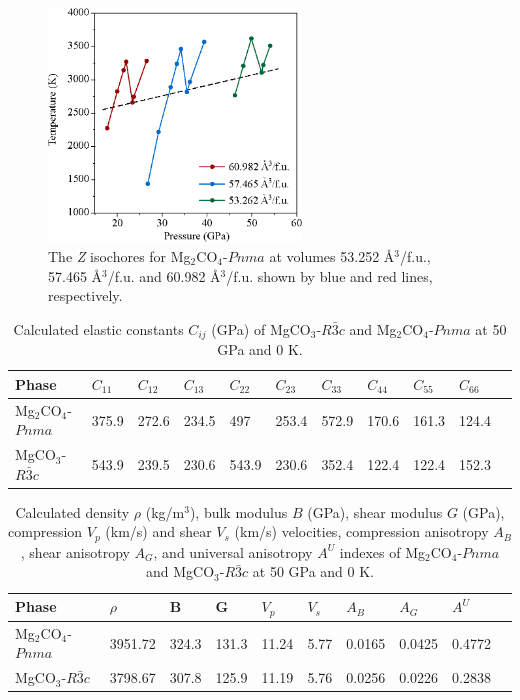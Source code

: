 \documentclass[a4paperm]{article}
\begin{document}
\begin{figure}[H]
	\includegraphics[width=0.6\textwidth]{Zcurve} \centering
	\caption{The {\it Z} isochores for Mg$_2$CO$_4$-$Pnma$ at volumes 53.252 \AA{$^3$}/f.u., 57.465 \AA{$^3$}/f.u. and 60.982 \AA{$^3$}/f.u. shown by blue and red lines, respectively.} \label{Zcurve}
\end{figure}

	\begin{table}[H]
	\caption{Calculated elastic constants $C_{ij}$ (GPa) of MgCO$_3$-$R\bar{3}c$ and Mg$_2$CO$_4$-$Pnma$ at 50 GPa and 0 K.} \label{elastic_const} \vspace{2mm} 
	\begin{tabular}{l*{10}{l}}
		\hline \hline
Phase	&	$C_{11}$	&	$C_{12}$	&	$C_{13}$	&	$C_{22}$	&	$C_{23}$	&	$C_{33}$	&	$C_{44}$	&	$C_{55}$	&	$C_{66}$	\\
\hline
Mg$_2$CO$_4$-$Pnma$	&	375.9	&	272.6	&	234.5	&	497	&	253.4	&	572.9	&	170.6	&	161.3	&	124.4	\\                                                                                              
MgCO$_3$-$R\bar{3}c$	&	543.9	&	239.5	&	230.6	&	543.9	&	230.6	&	352.4	&	122.4	&	122.4	&	152.3	\\

		\hline \hline
	\end{tabular}
\end{table}

	\begin{table}[H]
	\caption{Calculated density $\rho$ (kg/m$^3$), bulk modulus $B$ (GPa), shear modulus $G$ (GPa), compression $V_p$ (km/s) and shear $V_s$ (km/s) velocities, compression anisotropy $A_B$, shear anisotropy $A_G$, and universal anisotropy $A^U$ indexes of Mg$_2$CO$_4$-$Pnma$ and MgCO$_3$-$R\bar{3}c$ at 50 GPa and 0 K.} \vspace{2mm} \label{moduli}
		\begin{tabular}{l*{9}{l}}
			\hline \hline
					
			Phase	& $\rho$	& B &	G	& $V_p$&  $V_s$ &	$A_B$	&	$A_G$	&	$A^U$	\\
			\hline
			Mg$_2$CO$_4$-$Pnma$	& 3951.72 &	324.3	&	131.3	& 11.24  & 5.77 &	0.0165	&	0.0425	&	0.4772	\\
			MgCO$_3$-$R\bar{3}c$ & 3798.67 &	307.8	&	125.9	& 11.19 & 5.76	&   0.0256	&	0.0226	&	0.2838	\\
			
			\hline \hline
	\end{tabular}
\end{table}




%
\end{document}
